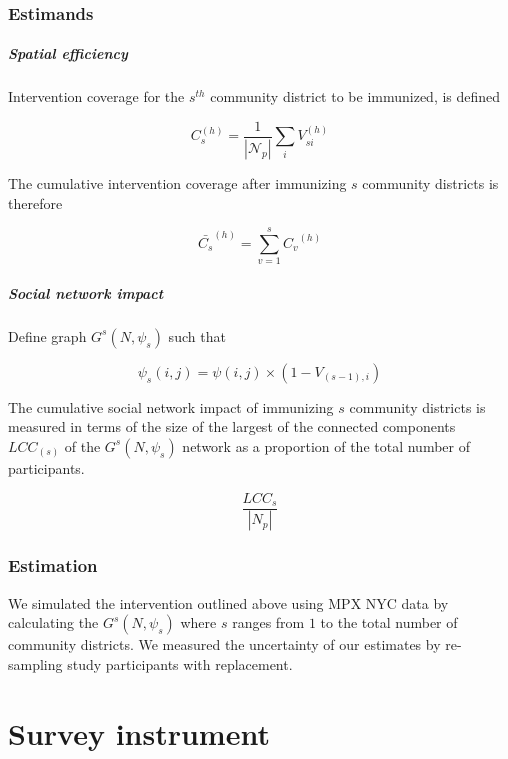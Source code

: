 \documentclass[
  letterpaper,
  DIV=11,
  numbers=noendperiod,
  oneside]{scrreprt}
\let\oldparagraph\paragraph
\renewcommand{\paragraph}[1]{\oldparagraph{#1}\mbox{}}
\begin{document}
\hypertarget{estimands-2}{%
\subsection{Estimands}\label{estimands-2}}

\hypertarget{spatial-efficiency-2}{%
\paragraph{Spatial efficiency}\label{spatial-efficiency-2}}

Intervention coverage for the \(s^{th}\) community district to be
immunized, is defined

\[
C_s^{(h)} = \frac{1}{|\mathscr{N}_p|}\sum_i V_{si}^{(h)} 
\]

The cumulative intervention coverage after immunizing \(s\) community
districts is therefore

\[ 
\bar{C_s}^{(h)} = \sum_{v = 1}^s{C_v }^{(h)}
\]

\hypertarget{social-network-impact}{%
\paragraph{Social network impact}\label{social-network-impact}}

Define graph \(G^{s}(N, \psi_s)\) such that

\[
\psi_s(i, j) = \psi(i, j) \times (1 -V_{(s-1), i})
\]

The cumulative social network impact of immunizing \(s\) community
districts is measured in terms of the size of the largest of the
connected components \(LCC_{(s)}\) of the \(G^{s}(N, \psi_s)\) network
as a proportion of the total number of participants.

\[
\frac{LCC_s}{|N_p|}
\]

\hypertarget{estimation-2}{%
\subsection{Estimation}\label{estimation-2}}

We simulated the intervention outlined above using MPX NYC data by
calculating the \(G^{s}(N, \psi_s)\) where \(s\) ranges from \(1\) to
the total number of community districts. We measured the uncertainty of
our estimates by re-sampling study participants with replacement.

\hypertarget{sec-data}{%
\chapter{Survey instrument}\label{sec-data}}
\end{document}
